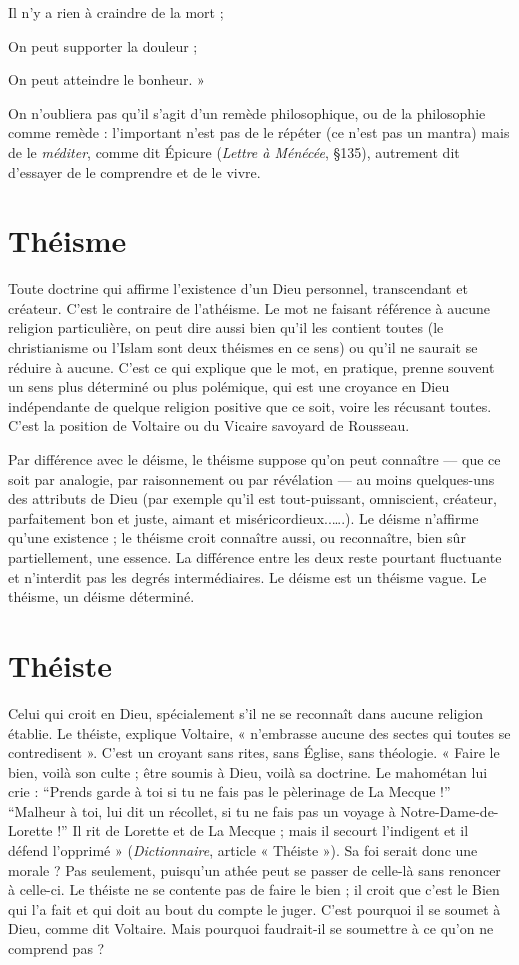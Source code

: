 Il n’y a rien à craindre de la mort ;

On peut supporter la douleur ;

On peut atteindre le bonheur. »

On n’oubliera pas qu’il s’agit d’un remède philosophique, ou de la philosophie
comme remède : l'important n’est pas de le répéter (ce n’est pas un
mantra) mais de le {\it méditer}, comme dit Épicure ({\it Lettre à Ménécée}, \S 135),
autrement dit d’essayer de le comprendre et de le vivre.

\section{Théisme}
Toute doctrine qui affirme l'existence d’un Dieu personnel,
transcendant et créateur. C’est le contraire de l’athéisme. Le mot
ne faisant référence à aucune religion particulière, on peut dire aussi bien qu’il les
contient toutes (le christianisme ou l’Islam sont deux théismes en ce sens) ou
qu'il ne saurait se réduire à aucune. C’est ce qui explique que le mot, en pratique,
prenne souvent un sens plus déterminé ou plus polémique, qui est une croyance
en Dieu indépendante de quelque religion positive que ce soit, voire les récusant
toutes. C’est la position de Voltaire ou du Vicaire savoyard de Rousseau.

Par différence avec le déisme, le théisme suppose qu’on peut connaître —
que ce soit par analogie, par raisonnement ou par révélation — au moins
quelques-uns des attributs de Dieu (par exemple qu’il est tout-puissant, omniscient,
créateur, parfaitement bon et juste, aimant et miséricordieux..….). Le
déisme n’affirme qu’une existence ; le théisme croit connaître aussi, ou reconnaître,
bien sûr partiellement, une essence. La différence entre les deux reste
pourtant fluctuante et n’interdit pas les degrés intermédiaires. Le déisme est un
théisme vague. Le théisme, un déisme déterminé.

\section{Théiste}
Celui qui croit en Dieu, spécialement s’il ne se reconnaît dans
aucune religion établie. Le théiste, explique Voltaire, « n’embrasse
aucune des sectes qui toutes se contredisent ». C’est un croyant sans rites, sans
Église, sans théologie. « Faire le bien, voilà son culte ; être soumis à Dieu, voilà
sa doctrine. Le mahométan lui crie : “Prends garde à toi si tu ne fais pas le pèlerinage
de La Mecque !” “Malheur à toi, lui dit un récollet, si tu ne fais pas un
voyage à Notre-Dame-de-Lorette !” Il rit de Lorette et de La Mecque ; mais il
secourt l’indigent et il défend l'opprimé » ({\it Dictionnaire}, article « Théiste »).
Sa foi serait donc une morale ? Pas seulement, puisqu’un athée peut se passer
de celle-là sans renoncer à celle-ci. Le théiste ne se contente pas de faire le bien ;
il croit que c’est le Bien qui l’a fait et qui doit au bout du compte le juger. C’est
pourquoi il se soumet à Dieu, comme dit Voltaire. Mais pourquoi faudrait-il se
soumettre à ce qu’on ne comprend pas ?

